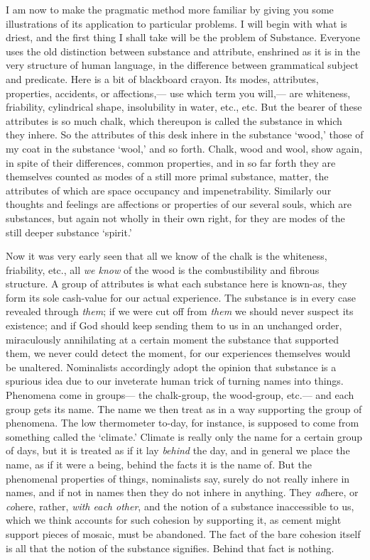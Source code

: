 \documentclass[]{article}
\begin{document}
I am now to make the pragmatic method more familiar by giving you some illustrations of its application to particular problems. I will begin with what is driest, and the first thing I shall take will be the problem of Substance. Everyone uses the old distinction between substance and attribute, enshrined as it is in the very structure of human language, in the difference between grammatical subject and predicate. Here is a bit of blackboard crayon. Its modes, attributes, properties, accidents, or affections,--- use which term you will,--- are whiteness, friability, cylindrical shape, insolubility in water, etc., etc. But the bearer of these attributes is so much chalk, which thereupon is called the substance in which they inhere. So the attributes of this desk inhere in the substance `wood,' those of my coat in the substance `wool,' and so forth. Chalk, wood and wool, show again, in spite of their differences, common properties, and in so far forth they are themselves counted as modes of a still more primal substance, matter, the attributes of which are space occupancy and impenetrability. Similarly our thoughts and feelings are affections or properties of our several souls, which are substances, but again not wholly in their own right, for they are modes of the still deeper substance `spirit.'

Now it was very early seen that all we know of the chalk is the whiteness, friability, etc., all \emph{we know} of the wood is the combustibility and fibrous structure. A group of attributes is what each substance here is known-as, they form its sole cash-value for our actual experience. The substance is in every case revealed through \emph{them}; if we were cut off from \emph{them} we should never suspect its existence; and if God should keep sending them to us in an unchanged order, miraculously annihilating at a certain moment the substance that supported them, we never could detect the moment, for our experiences themselves would be unaltered. Nominalists accordingly adopt the opinion that substance is a spurious idea due to our inveterate human trick of turning names into things. Phenomena come in groups--- the chalk-group, the wood-group, etc.--- and each group gets its name. The name we then treat as in a way supporting the group of phenomena. The low thermometer to-day, for instance, is supposed to come from something called the `climate.' Climate is really only the name for a certain group of days, but it is treated as if it lay \emph{behind} the day, and in general we place the name, as if it were a being, behind the facts it is the name of. But the phenomenal properties of things, nominalists say, surely do not really inhere in names, and if not in names then they do not inhere in anything. They \emph{ad}here, or \emph{co}here, rather, \emph{with each other}, and the notion of a substance inaccessible to us, which we think accounts for such cohesion by supporting it, as cement might support pieces of mosaic, must be abandoned. The fact of the bare cohesion itself is all that the notion of the substance signifies. Behind that fact is nothing.
\end{document}
